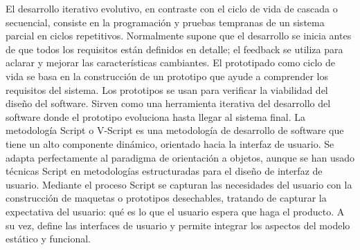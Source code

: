 El desarrollo iterativo evolutivo, en contraste con el ciclo de vida de cascada o secuencial, consiste en la programación y pruebas tempranas de un sistema parcial en ciclos repetitivos. Normalmente supone que el desarrollo se inicia antes de que todos los requisitos están definidos en detalle; el feedback se utiliza para aclarar y mejorar las características cambiantes.
El prototipado como ciclo de vida se basa en la construcción de un prototipo que ayude a comprender los requisitos del sistema. Los prototipos se usan para verificar la viabilidad del diseño del software. Sirven como una herramienta iterativa del desarrollo del software donde el prototipo evoluciona hasta llegar al sistema final. La metodología Script o V-Script es una metodología de desarrollo de software que tiene un alto componente dinámico, orientado hacia la interfaz de usuario. Se adapta perfectamente al paradigma de orientación a objetos, aunque se han usado técnicas Script en metodologías estructuradas para el diseño de interfaz de usuario.
Mediante el proceso Script se capturan las necesidades del usuario con la construcción de maquetas o prototipos desechables, tratando de capturar la expectativa del usuario: qué es lo que el usuario espera que haga el producto. A su vez, define las interfaces de usuario y permite integrar los aspectos del modelo estático y funcional.
